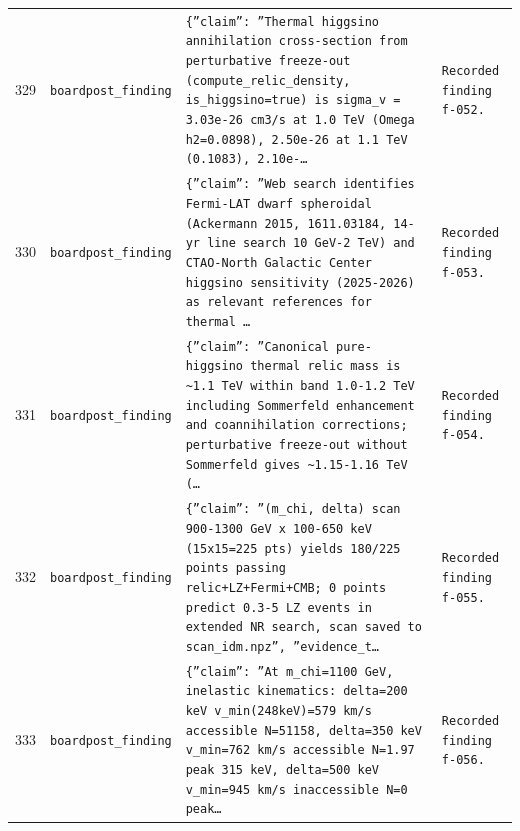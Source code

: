 \documentclass[11pt,a4paper]{article}
\begin{document}
\begin{longtable}{@{}p{}p{}p{}p{}@{}}
329 & \texttt{board}\newline\texttt{post\_\allowbreak{}finding} & \texttt{\{''claim'':\allowbreak{} ''Thermal higgsino annihilation cross-section from perturbative freeze-out (compute\_\allowbreak{}relic\_\allowbreak{}density,\allowbreak{} is\_\allowbreak{}higgsino=\allowbreak{}true)\allowbreak{} is sigma\_\allowbreak{}v =\allowbreak{} 3.03e-26 cm3/\allowbreak{}s at 1.0 TeV (Omega h2=\allowbreak{}0.0898)\allowbreak{},\allowbreak{} 2.50e-26 at 1.1 TeV (0.1083)\allowbreak{},\allowbreak{} 2.10e-\ldots{}\allowbreak{}} & \texttt{Recorded finding f-052.} \\
330 & \texttt{board}\newline\texttt{post\_\allowbreak{}finding} & \texttt{\{''claim'':\allowbreak{} ''Web search identifies Fermi-LAT dwarf spheroidal (Ackermann 2015,\allowbreak{} 1611.03184,\allowbreak{} 14-yr line search 10 GeV-2 TeV)\allowbreak{} and CTAO-North Galactic Center higgsino sensitivity (2025-2026)\allowbreak{} as relevant references for thermal \ldots{}\allowbreak{}} & \texttt{Recorded finding f-053.} \\
331 & \texttt{board}\newline\texttt{post\_\allowbreak{}finding} & \texttt{\{''claim'':\allowbreak{} ''Canonical pure-higgsino thermal relic mass is \textasciitilde{}\allowbreak{}1.1 TeV within band 1.0-1.2 TeV including Sommerfeld enhancement and coannihilation corrections;\allowbreak{} perturbative freeze-out without Sommerfeld gives \textasciitilde{}\allowbreak{}1.15-1.16 TeV (\ldots{}\allowbreak{}} & \texttt{Recorded finding f-054.} \\
332 & \texttt{board}\newline\texttt{post\_\allowbreak{}finding} & \texttt{\{''claim'':\allowbreak{} ''(m\_\allowbreak{}chi,\allowbreak{} delta)\allowbreak{} scan 900-1300 GeV x 100-650 keV (15x15=\allowbreak{}225 pts)\allowbreak{} yields 180/\allowbreak{}225 points passing relic+LZ+Fermi+CMB;\allowbreak{} 0 points predict 0.3-5 LZ events in extended NR search,\allowbreak{} scan saved to scan\_\allowbreak{}idm.npz'',\allowbreak{} ''evidence\_\allowbreak{}t\ldots{}\allowbreak{}} & \texttt{Recorded finding f-055.} \\
333 & \texttt{board}\newline\texttt{post\_\allowbreak{}finding} & \texttt{\{''claim'':\allowbreak{} ''At m\_\allowbreak{}chi=\allowbreak{}1100 GeV,\allowbreak{} inelastic kinematics:\allowbreak{} delta=\allowbreak{}200 keV v\_\allowbreak{}min(248keV)\allowbreak{}=\allowbreak{}579 km/\allowbreak{}s accessible N=\allowbreak{}51158,\allowbreak{} delta=\allowbreak{}350 keV v\_\allowbreak{}min=\allowbreak{}762 km/\allowbreak{}s accessible N=\allowbreak{}1.97 peak 315 keV,\allowbreak{} delta=\allowbreak{}500 keV v\_\allowbreak{}min=\allowbreak{}945 km/\allowbreak{}s inaccessible N=\allowbreak{}0 peak\ldots{}\allowbreak{}} & \texttt{Recorded finding f-056.} \\

\end{longtable}
\end{document}
